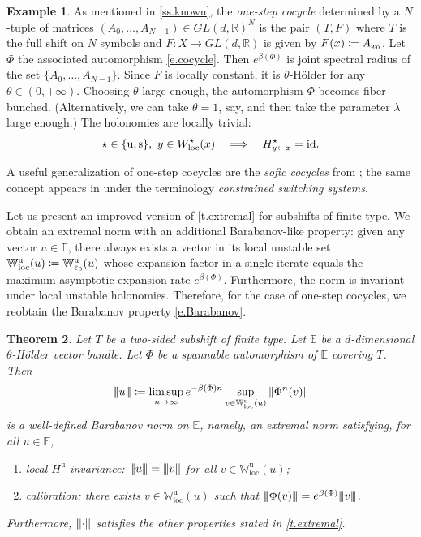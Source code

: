 \documentclass[10pt]{amsart}
\def\vcentcolon{\mathrel{\mathop\ordinarycolon}}
\providecommand\ordinarycolon{:}
\providecommand*\coloneqq{\vcentcolon\mathrel{\mkern-1.2mu}=}
\newcommand\implique{\mathchoice{\Longrightarrow}{\Rightarrow}{\Rightarrow}{\Rightarrow}}
\theoremstyle{plain}
\newtheorem{theorem}{Theorem}[section]
\theoremstyle{definition}
\newtheorem{example}[theorem]{Example}
\renewcommand{\theenumi}{\alph{enumi}}%
\newcommand{\tribar}[1]{\mathopen{| {\kern -1.5pt} | {\kern -1.5pt} |} {#1}
\mathclose{| {\kern -1.5pt} | {\kern -1.5pt} |}}
\newcommand{\RR}{\mathbb{R}}
\newcommand{\EE}{\mathbb{E}}
\newcommand{\WW}{\mathbb{W}}
\newcommand{\id}{\mathrm{id}}
\newcommand{\GL}{\mathit{GL}}
\newcommand{\uu}{\mathrm{u}}
\renewcommand{\ss}{\mathrm{s}}
\let\epsilon\varepsilon
\begin{document}
\begin{example}\label{ex.one-step}
As mentioned in \cref{ss.known},
the \emph{one-step cocycle} determined by a $N$-tuple of matrices $(A_0,\dots,A_{N-1}) \in \GL(d,\RR)^N$ is the pair $(T,F)$ where $T$ is the full shift on $N$ symbols and $F \colon X \to \GL(d,\RR)$ is given by $F(x) \coloneqq A_{x_0}$.
Let~$\Phi$ the associated automorphism \eqref{e.cocycle}.
Then $e^{\beta(\Phi)}$ is joint spectral radius of the set $\{A_0,\dots,A_{N-1}\}$.
Since $F$ is locally constant, it is $\theta$-Hölder for any $\theta \in (0,+\infty)$.
Choosing $\theta$ large enough, the automorphism $\Phi$ becomes fiber-bunched.
(Alternatively, we can take $\theta=1$, say, and then take the parameter $\lambda$ large enough.)
The holonomies are locally trivial:
\begin{equation}\label{e.trivial_holonomies}
\star \in \{\uu, \ss\}, \
y \in W^\star_\mathrm{loc}(x) \quad \implique \quad H^\star_{y \gets x} = \id.
\end{equation}

A useful generalization of one-step cocycles are the \emph{sofic cocycles} from \cite[\S 5.1]{BPS}; the same concept appears in \cite{PEDJ} under the terminology \emph{constrained switching systems}.
\end{example}

Let us present an improved version of \cref{t.extremal} for subshifts of finite type.
We obtain an extremal norm with an additional Barabanov-like property:
given any vector $u \in \EE $, there always exists a vector in its local unstable set $\WW^\uu_\mathrm{loc}(u) \coloneqq \WW^\uu_{\epsilon_0}(u)$ whose expansion factor in a single
iterate equals the maximum asymptotic expansion rate $ e^{\beta(\Phi)} $.
Furthermore, the norm is invariant under local unstable holonomies.
Therefore, for the case of one-step cocycles, we reobtain the Barabanov property \eqref{e.Barabanov}.

\begin{theorem}\label{t.Barabanov}
Let $ T $ be a two-sided subshift of finite type.
Let $ \EE $ be a $d$-dimensional $\theta$-Hölder vector bundle.
Let $ \Phi $ be a spannable automorphism of $ \EE $ covering $ T $.
Then
\begin{equation}\label{e.formula_Barabanov}
\tribar{u} \coloneqq \limsup_{n \to \infty} e^{-\beta(\Phi) n} \sup_{v \in \WW^{\uu}_{\mathrm{loc}}(u)} \| \Phi^n (v) \|
\end{equation}
is a well-defined \emph{Barabanov norm} on $ \EE $, namely, an extremal norm satisfying, for all $ u \in \EE$,
\begin{enumerate}\renewcommand{\theenumi}{\arabic{enumi}}%
\item\label{i.Barabanov_invariance}
\emph{local $H^{\uu}$-invariance:} $ \tribar{u} = \tribar{v}$ for all $ v \in \WW^{\uu}_{\mathrm{loc}}(u) $;
\item\label{i.Barabanov_calibration}
\emph{calibration:} there exists $ v \in \WW^{\uu}_{\mathrm{loc}}(u) $ such that $ \tribar{\Phi(v)} = e^{\beta(\Phi)} \tribar{v}$.
\end{enumerate}
Furthermore, $\tribar{\mathord{\cdot}}$ satisfies the other properties stated in \cref{t.extremal}.
\end{theorem}
\end{document}
